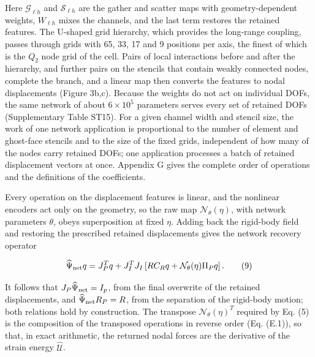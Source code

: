 \documentclass[preprint,12pt,authoryear]{elsarticle}
\begin{document}
Here \(\mathcal G_{\ell h}\) and \(\mathcal S_{\ell h}\) are the gather and scatter maps with geometry-dependent weights, \(W_{\ell h}\) mixes the channels, and the last term restores the retained features. The U-shaped grid hierarchy, which provides the long-range coupling, passes through grids with 65, 33, 17 and 9 positions per axis, the finest of which is the \(Q_2\) node grid of the cell. Pairs of local interactions before and after the hierarchy, and further pairs on the stencils that contain weakly connected nodes, complete the branch, and a linear map then converts the features to nodal displacements (Figure 3b,c). Because the weights do not act on individual DOFs, the same network of about \(6\times10^5\) parameters serves every set of retained DOFs (Supplementary Table ST15). For a given channel width and stencil size, the work of one network application is proportional to the number of element and ghost-face stencils and to the size of the fixed grids, independent of how many of the nodes carry retained DOFs; one application processes a batch of retained displacement vectors at once. Appendix G gives the complete order of operations and the definitions of the coefficients.

Every operation on the displacement features is linear, and the nonlinear encoders act only on the geometry, so the raw map \(\mathcal N_\theta(\eta)\), with network parameters \(\theta\), obeys superposition at fixed \(\eta\). Adding back the rigid-body field and restoring the prescribed retained displacements gives the network recovery operator

\[
\widehat\Psi_{\rm net} q=J_P^Tq+
J_I^TJ_I\left[RC_Rq+\mathcal N_\theta(\eta)\Pi_Pq\right].
\tag{9}
\]

It follows that \(J_P\widehat\Psi_{\rm net}=I_p\), from the final overwrite of the retained displacements, and \(\widehat\Psi_{\rm net}R_P=R\), from the separation of the rigid-body motion; both relations hold by construction. The transpose \(\mathcal N_\theta(\eta)^T\) required by Eq. (5) is the composition of the transposed operations in reverse order (Eq. (E.1)), so that, in exact arithmetic, the returned nodal forces are the derivative of the strain energy \(\widehat{\mathcal U}\).
\end{document}
